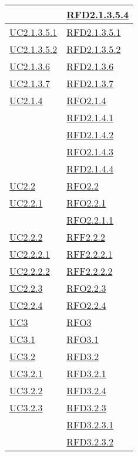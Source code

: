 \begin{longtable}{|>{\centering}m{5cm}|m{5cm}<{\centering}|}
& \hyperlink{RFD2.1.3.5.4}{RFD2.1.3.5.4}\\ \hline
\hyperref[UC2.1.3.5.1]{UC2.1.3.5.1} & \hyperlink{RFD2.1.3.5.1}{RFD2.1.3.5.1}\\ \hline
\hyperref[UC2.1.3.5.2]{UC2.1.3.5.2} & \hyperlink{RFD2.1.3.5.2}{RFD2.1.3.5.2}\\ \hline
\hyperref[UC2.1.3.6]{UC2.1.3.6} & \hyperlink{RFD2.1.3.6}{RFD2.1.3.6}\\ \hline
\hyperref[UC2.1.3.7]{UC2.1.3.7} & \hyperlink{RFD2.1.3.7}{RFD2.1.3.7}\\ \hline
\hyperref[UC2.1.4]{UC2.1.4} & \hyperlink{RFO2.1.4}{RFO2.1.4}\\
& \hyperlink{RFD2.1.4.1}{RFD2.1.4.1}\\
& \hyperlink{RFD2.1.4.2}{RFD2.1.4.2}\\
& \hyperlink{RFO2.1.4.3}{RFO2.1.4.3}\\
& \hyperlink{RFD2.1.4.4}{RFD2.1.4.4}\\ \hline
\hyperref[UC2.2]{UC2.2} & \hyperlink{RFO2.2}{RFO2.2}\\ \hline
\hyperref[UC2.2.1]{UC2.2.1} & \hyperlink{RFO2.2.1}{RFO2.2.1}\\
& \hyperlink{RFO2.2.1.1}{RFO2.2.1.1}\\ \hline
\hyperref[UC2.2.2]{UC2.2.2} & \hyperlink{RFF2.2.2}{RFF2.2.2}\\ \hline
\hyperref[UC2.2.2.1]{UC2.2.2.1} & \hyperlink{RFF2.2.2.1}{RFF2.2.2.1}\\ \hline
\hyperref[UC2.2.2.2]{UC2.2.2.2} & \hyperlink{RFF2.2.2.2}{RFF2.2.2.2}\\ \hline
\hyperref[UC2.2.3]{UC2.2.3} & \hyperlink{RFO2.2.3}{RFO2.2.3}\\ \hline
\hyperref[UC2.2.4]{UC2.2.4} & \hyperlink{RFO2.2.4}{RFO2.2.4}\\ \hline
\hyperref[UC3]{UC3} & \hyperlink{RFO3}{RFO3}\\ \hline
\hyperref[UC3.1]{UC3.1} & \hyperlink{RFO3.1}{RFO3.1}\\ \hline
\hyperref[UC3.2]{UC3.2} & \hyperlink{RFD3.2}{RFD3.2}\\ \hline
\hyperref[UC3.2.1]{UC3.2.1} & \hyperlink{RFD3.2.1}{RFD3.2.1}\\ \hline
\hyperref[UC3.2.2]{UC3.2.2} & \hyperlink{RFD3.2.4}{RFD3.2.4}\\ \hline
\hyperref[UC3.2.3]{UC3.2.3} & \hyperlink{RFD3.2.3}{RFD3.2.3}\\
& \hyperlink{RFD3.2.3.1}{RFD3.2.3.1}\\
& \hyperlink{RFD3.2.3.2}{RFD3.2.3.2}\\ \hline

\end{longtable}
